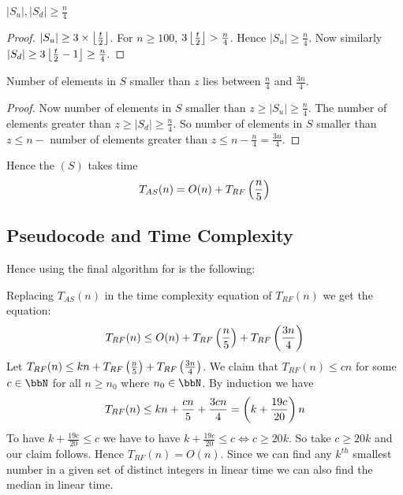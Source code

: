 \begin{lemma}{}{}
	$|S_u|,|S_d|\geq\frac{n}{4}$
\end{lemma}
\begin{proof}
	$|S_u|\geq 3\times \left\lfloor\frac{t}{2}\right\rfloor$. For $n\geq 100$, $3\left\lfloor\frac{t}{2}\right\rfloor> \frac{n}{4}$. Hence $|S_u|\geq \frac{n}{4}$. Now similarly $|S_d|\geq 3\left\lfloor\frac{t}{2}-1\right\rfloor\geq \frac{n}{4}$.
\end{proof}
\begin{lemma}{}{}
	Number of elements in $S$ smaller than $z$ lies between $\frac{n}4$ and $\frac{3n}{4}$.
\end{lemma}
\begin{proof}
	Now number of elements in $S$ smaller than $z\geq |S_u|\geq \frac{n}4$. The number of elements greater than $z\geq |S_d|\geq \frac{n}{4}$. So number of elements in $S$ smaller than $z\leq n-$ number of elements greater than $z\leq n-\frac{n}4=\frac{3n}{4}$.
\end{proof}
Hence the $(S)$ takes time $$T_{AS}(n)=O(n)+T_{RF}\left(\frac{n}{5}\right)$$
\subsection{Pseudocode and Time Complexity}
Hence using  the final algorithm for  is the following:
\begin{center}
	\begin{algorithm}
		\DontPrintSemicolon
		\caption{(S,k)}
	\end{algorithm}
\end{center}
Replacing $T_{AS}(n)$ in the time complexity equation of $T_{RF}(n)$ we get the equation:$$T_{RF}(n)\leq O(n)+T_{RF}\left(\frac{n}5\right)+T_{RF}\left(\frac{3n}{4}\right)$$Let $T_{RF}(n)\leq kn+T_{RF}\left(\frac{n}5\right)+T_{RF}\left(\frac{3n}{4}\right)$. We claim that $T_{RF}(n)\leq cn$ for some $c\in \bbN$ for all $n\geq n_0$ where $n_0\in \bbN$. By induction we have $$T_{RF}(n)\leq kn+\frac{cn}{5}+\frac{3cn}{4}=\left(k+\frac{19c}{20}\right)n$$To have  $k+\frac{19c}{20}\leq c$ we have to have $k+\frac{19c}{20}\leq c\iff c\geq 20k$. So take $c\geq 20k$ and our claim follows. Hence $T_{RF}(n)=O(n)$. Since we can find any $k^{th}$ smallest number in a given set of distinct integers in linear time we can also find the median in linear time.